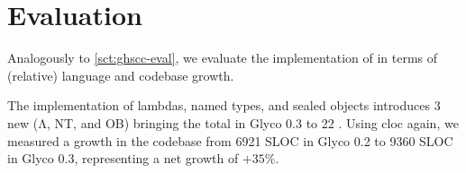 \documentclass[main.tex]{subfiles}
\begin{document}
\section{Evaluation} \label{sct:obj-eval}
Analogously to \cref{sct:ghscc-eval}, we evaluate the implementation of  in terms of (relative) language and codebase growth.

The implementation of lambdas, named types, and sealed objects introduces 3 new  (Λ, NT, and OB) bringing the total in Glyco 0.3 to 22 . Using cloc again, we measured a growth in the codebase from 6921 SLOC in Glyco 0.2 to 9360 SLOC in Glyco 0.3, representing a net growth of $+35\%$.

\onlyinsubfile{\glsaddall\printglossaries}
\end{document}
